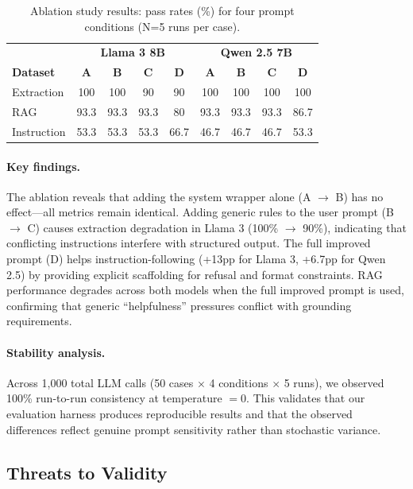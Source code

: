 \begin{table}[h]
\centering
\caption{Ablation study results: pass rates (\%) for four prompt conditions (N=5 runs per case).}
\label{tab:ablation-results}
\begin{tabular}{@{}l cccc cccc@{}}
\toprule
 & \multicolumn{4}{c}{\textbf{Llama 3 8B}} & \multicolumn{4}{c}{\textbf{Qwen 2.5 7B}} \\
\textbf{Dataset} & \textbf{A} & \textbf{B} & \textbf{C} & \textbf{D} & \textbf{A} & \textbf{B} & \textbf{C} & \textbf{D} \\
\midrule
Extraction & 100 & 100 & 90 & 90 & 100 & 100 & 100 & 100 \\
RAG & 93.3 & 93.3 & 93.3 & 80 & 93.3 & 93.3 & 93.3 & 86.7 \\
Instruction & 53.3 & 53.3 & 53.3 & 66.7 & 46.7 & 46.7 & 46.7 & 53.3 \\
\bottomrule
\end{tabular}
\end{table}

\paragraph{Key findings.} The ablation reveals that adding the system wrapper alone (A $\rightarrow$ B) has no effect---all metrics remain identical. Adding generic rules to the user prompt (B $\rightarrow$ C) causes extraction degradation in Llama 3 (100\% $\rightarrow$ 90\%), indicating that conflicting instructions interfere with structured output. The full improved prompt (D) helps instruction-following (+13pp for Llama 3, +6.7pp for Qwen 2.5) by providing explicit scaffolding for refusal and format constraints. RAG performance degrades across both models when the full improved prompt is used, confirming that generic ``helpfulness'' pressures conflict with grounding requirements.

\paragraph{Stability analysis.} Across 1,000 total LLM calls (50 cases $\times$ 4 conditions $\times$ 5 runs), we observed 100\% run-to-run consistency at temperature $= 0$. This validates that our evaluation harness produces reproducible results and that the observed differences reflect genuine prompt sensitivity rather than stochastic variance.

\subsection{Threats to Validity}

